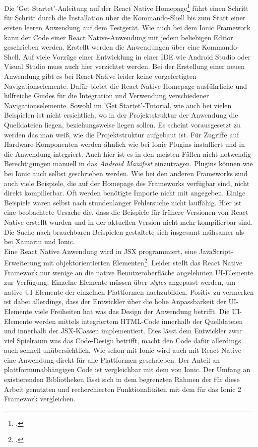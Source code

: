 \\
\\
Die 'Get Startet'-Anleitung auf der React Native Homepage\footcite{ReactNativeHomepage} führt einen Schritt für Schritt durch die Installation über die Kommando-Shell bis zum Start einer ersten leeren Anwendung auf dem Testgerät. Wie auch bei dem Ionic Framework kann der Code einer React Native-Anwendung mit jedem beliebigen Editor geschrieben werden. Erstellt werden die Anwendungen über eine Kommando-Shell. Auf viele Vorzüge einer Entwicklung in einer IDE wie Android Studio oder Visual Studio muss auch hier verzichtet werden. Bei der Erstellung einer neuen Anwendung gibt es bei React Native leider keine vorgefertigten Navigationselemente. Dafür bietet die React Native Homepage ausführliche und hilfreiche Guides für die Integration und Verwendung verschiedener Navigationselemente. Sowohl im 'Get Startet'-Tutorial, wie auch bei vielen Beispielen ist nicht ersichtlich, wo in der Projektstruktur der Anwendung die Quelldateien liegen, beziehungsweise liegen sollen. Es scheint vorausgesetzt zu werden das man weiß, wie die Projektstruktur aufgebaut ist. Für Zugriffe auf Hardware-Komponenten werden ähnlich wie bei Ionic Plugins installiert und in die Anwendung integriert. Auch hier ist es in den meisten Fällen nicht notwendig Berechtigungen manuell in das \textit{Android Manifest} einzutragen. Plugins können wie bei Ionic auch selbst geschrieben werden. Wie bei den anderen Frameworks sind auch viele Beispiele, die auf der Homepage des Frameworks verfügbar sind, nicht direkt kompilierbar. Oft werden benötigte Importe nicht mit angegeben. Einige Beispiele waren selbst nach stundenlanger Fehlersuche nicht lauffähig. Hier ist eine beobachtete Ursache die, dass die Beispiele für frühere Versionen von React Native erstellt wurden und in der aktuellen Version nicht mehr kompilierbar sind. Die Suche nach brauchbaren Beispielen gestaltete sich insgesamt mühsamer als bei Xamarin und Ionic.
\\
Eine React Native Anwendung wird in JSX programmiert, eine JavaScript-Erweiterung mit objektorientierten Elementen\footcite{JSX}. Leider stellt das React Native Framework nur wenige an die native Benutzeroberfläche angelehnten UI-Elemente zur Verfügung. Einzelne Elemente müssen über \textit{styles} angepasst werden, um native UI-Elemente der einzelnen Plattformen nachzubilden. Positiv zu vermerken ist dabei allerdings, dass der Entwickler über die hohe Anpassbarkeit der UI-Elemente viele Freiheiten hat was das Design der Anwendung betrifft. Die UI-Elemente werden mittels integriertem HTML-Code innerhalb der Quelldateien und innerhalb der JSX-Klassen implementiert. Dies lässt dem Entwickler zwar viel Spielraum was das Code-Design betrifft, macht den Code dafür allerdings auch schnell unübersichtlich. Wie schon mit Ionic wird auch mit React Native eine Anwendung direkt für alle Plattformen geschrieben. Der Anteil an plattformunabhängigen Code ist vergleichbar mit dem von Ionic. Der Umfang an existierenden Bibliotheken lässt sich in dem begrenzten Rahmen der für diese Arbeit genutzten und recherchierten Funktionalitäten mit dem für das Ionic 2 Framework vergleichen.


